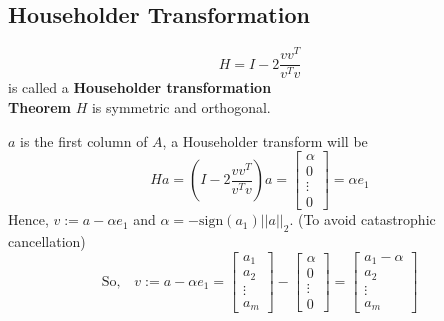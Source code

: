 \documentclass[9pt]{article}
\begin{document}
\begin{multicols}{3}
\hdashrule{\linewidth}{0.5pt}{1mm 1mm}
\vspace{-0.65cm}
\subsection*{Householder Transformation}
\[H = I - 2\frac{vv^T}{v^Tv}\]
is called a \textbf{Householder transformation}\\


\textbf{Theorem} $H$ is symmetric and orthogonal.


$a$ is  the first column of $A$, a Householder transform will be
\[Ha = \left( I - 2\frac{vv^T}{v^Tv} \right)a =
\begin{bmatrix}
    \alpha\\
    0\\
    \vdots\\
    0
\end{bmatrix}
= \alpha e_1
\]
Hence, $v := a - \alpha e_1$ and $\alpha = -\text{sign}(a_1)||a||_2$. (To avoid catastrophic cancellation)
\[
\text{So,} \quad
v:= a - \alpha e_1 =
\begin{bmatrix}
    a_1\\
    a_2\\
    \vdots\\
    a_m
\end{bmatrix}-
\begin{bmatrix}
    \alpha\\
    0\\
    \vdots\\
    0
\end{bmatrix}
=
\begin{bmatrix}
    a_1- \alpha\\
    a_2\\
    \vdots\\
    a_m
\end{bmatrix}
\]
\hdashrule{\linewidth}{0.5pt}{0.2mm 1mm}


\end{multicols}
\end{document}
